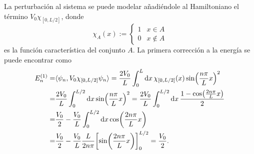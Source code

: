 \documentclass{article}
\begin{document}
\begin{enumerate}[1)]
\begin{enumerate}[a)]
La perturbación al sistema se puede modelar añadiéndole al Hamiltoniano el término $V_0\chi_{[0,L/2]}$, donde 
\begin{equation}
\chi_A(x):=\begin{cases}
1 & x\in A\\
0 & x\not\in A
\end{cases}
\end{equation} 
es la función característica del conjunto $A$. La primera corrección a la energía se puede encontrar como
\begin{align}
\begin{split}
E_n^{(1)}=&\langle\psi_n,V_0\chi_{[0,L/2]}\psi_n\rangle=\frac{2V_0}{L}\int_0^L\dd{x}\chi_{[0,L/2]}(x)\sin(\frac{n\pi}{L}x)^2\\
=&\frac{2V_0}{L}\int_0^{L/2}\dd{x}\sin(\frac{n\pi}{L}x)^2=\frac{2V_0}{L}\int_0^{L/2}\dd{x}\frac{1-\cos(\frac{2n\pi}{L}x)}{2}\\
=&\frac{V_0}{2}-\frac{V_0}{L}\int_0^{L/2}\dd{x}\cos(\frac{2n\pi}{L}x)\\
=&\frac{V_0}{2}-\frac{V_0}{L}\frac{L}{2n\pi}\qty[\sin(\frac{2n\pi}{L}x)]_0^{L/2}=\frac{V_0}{2}.
\end{split}
\end{align}


\end{enumerate}
\end{enumerate}
\end{document}
